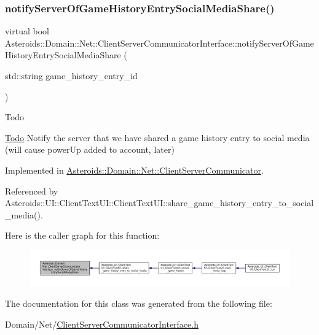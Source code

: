 \mbox{\label{classAsteroids_1_1Domain_1_1Net_1_1ClientServerCommunicatorInterface_a99c8f2baa739330f44096da950a1d145}} 
\subsubsection{\texorpdfstring{notify\+Server\+Of\+Game\+History\+Entry\+Social\+Media\+Share()}{notifyServerOfGameHistoryEntrySocialMediaShare()}}
{\footnotesize\ttfamily virtual bool Asteroids\+::\+Domain\+::\+Net\+::\+Client\+Server\+Communicator\+Interface\+::notify\+Server\+Of\+Game\+History\+Entry\+Social\+Media\+Share (\begin{DoxyParamCaption}\item[{std\+::string}]{game\+\_\+history\+\_\+entry\+\_\+id }\end{DoxyParamCaption})\hspace{0.3cm}{\ttfamily [pure virtual]}}

\begin{DoxyRefDesc}{Todo}
\item[\hyperlink{todo__todo000008}{Todo}]Notify the server that we have shared a game history entry to social media (will cause power\+Up added to account, later) \end{DoxyRefDesc}


Implemented in \hyperlink{classAsteroids_1_1Domain_1_1Net_1_1ClientServerCommunicator_a1910e3929adb473f705b82b793dff450}{Asteroids\+::\+Domain\+::\+Net\+::\+Client\+Server\+Communicator}.



Referenced by Asteroids\+::\+U\+I\+::\+Client\+Text\+U\+I\+::\+Client\+Text\+U\+I\+::share\+\_\+game\+\_\+history\+\_\+entry\+\_\+to\+\_\+social\+\_\+media().

Here is the caller graph for this function\+:\nopagebreak
\begin{figure}[H]
\begin{center}
\leavevmode
\includegraphics[width=350pt]{classAsteroids_1_1Domain_1_1Net_1_1ClientServerCommunicatorInterface_a99c8f2baa739330f44096da950a1d145_icgraph}
\end{center}
\end{figure}


The documentation for this class was generated from the following file\+:\begin{DoxyCompactItemize}
\item 
Domain/\+Net/\hyperlink{ClientServerCommunicatorInterface_8h}{Client\+Server\+Communicator\+Interface.\+h}\end{DoxyCompactItemize}
